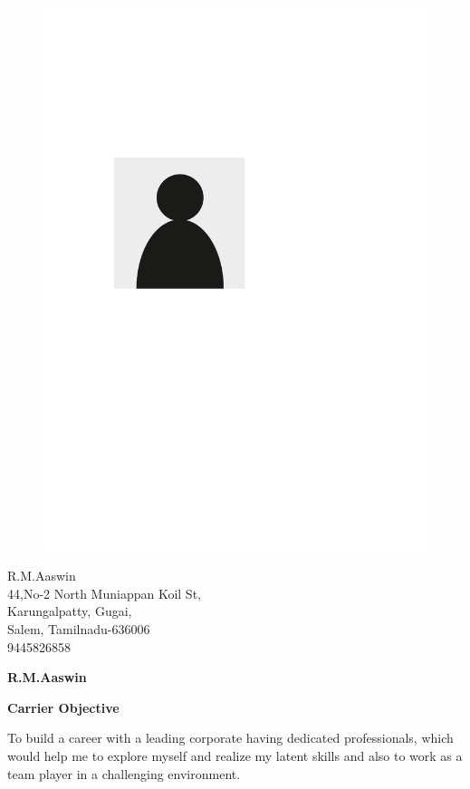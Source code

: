 \documentclass[a4paper,12pt,final]{memoir}
\newcommand{\SmallSep}{\vspace{0.5em}}
\newcommand{\CVSection}[1]
	{\Large\textbf{#1}\par
	\SmallSep\normalsize\normalfont}
\newcommand{\CVItem}[1]
	{\textbf{\color{RoyalBlue} #1}}
\begin{document}
\begin{figure}
	\hfill
	\includegraphics[width=0.6\columnwidth]{photo}
	\vspace{-7cm}
\end{figure}

\begin{flushright}\small
	R.M.Aaswin \\
	44,No-2 North Muniappan Koil St,\\
	Karungalpatty, Gugai, \\
	Salem, Tamilnadu-636006\\
	9445826858

\end{flushright}\normalsize
\framebreak


\Huge\bfseries {\color{RoyalBlue} R.M.Aaswin} \\


\normalsize\normalfont

\CVSection{Carrier Objective}
To build a career with a leading corporate having dedicated professionals, which would help me to explore myself and realize my latent skills and also to work as a team player in a challenging environment.
\SmallSep
\end{document}
